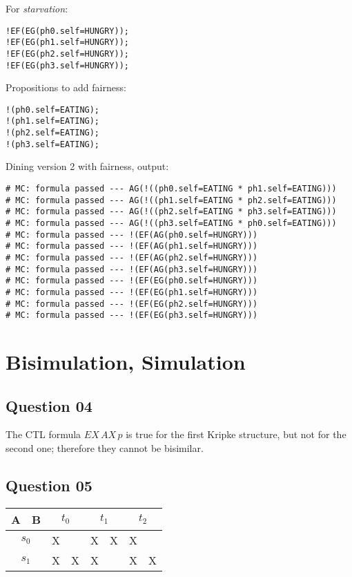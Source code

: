 \documentclass[a4paper]{article}
\begin{document}
For \emph{starvation}:
\begin{lstlisting}
!EF(EG(ph0.self=HUNGRY));
!EF(EG(ph1.self=HUNGRY));
!EF(EG(ph2.self=HUNGRY));
!EF(EG(ph3.self=HUNGRY));
\end{lstlisting}

Propositions to add fairness:
\begin{lstlisting}
!(ph0.self=EATING);
!(ph1.self=EATING);
!(ph2.self=EATING);
!(ph3.self=EATING);
\end{lstlisting}

Dining version 2 with fairness, output:
\begin{lstlisting}
# MC: formula passed --- AG(!((ph0.self=EATING * ph1.self=EATING)))
# MC: formula passed --- AG(!((ph1.self=EATING * ph2.self=EATING)))
# MC: formula passed --- AG(!((ph2.self=EATING * ph3.self=EATING)))
# MC: formula passed --- AG(!((ph3.self=EATING * ph0.self=EATING)))
# MC: formula passed --- !(EF(AG(ph0.self=HUNGRY)))
# MC: formula passed --- !(EF(AG(ph1.self=HUNGRY)))
# MC: formula passed --- !(EF(AG(ph2.self=HUNGRY)))
# MC: formula passed --- !(EF(AG(ph3.self=HUNGRY)))
# MC: formula passed --- !(EF(EG(ph0.self=HUNGRY)))
# MC: formula passed --- !(EF(EG(ph1.self=HUNGRY)))
# MC: formula passed --- !(EF(EG(ph2.self=HUNGRY)))
# MC: formula passed --- !(EF(EG(ph3.self=HUNGRY)))
\end{lstlisting}

\section*{Bisimulation, Simulation}

\subsection*{Question 04}

The CTL formula $EX\,AX\,p$ is true for the first Kripke structure, but not
for the second one; therefore they cannot be bisimilar.

\subsection*{Question 05}

\begin{center}
\begin{tabular}{ | l | l || l | l | l | l | l | l | }
  \hline
      A & B &
      \multicolumn{2}{c|}{$t_0$} &
      \multicolumn{2}{c|}{$t_1$} &
      \multicolumn{2}{c|}{$t_2$} \\
  \hline
  \hline
      \multicolumn{2}{|c||}{$s_0$}
      & X & & X & X & X & \\
  \hline
      \multicolumn{2}{|c||}{$s_1$}
      & X & X & X & & X & X \\
  \hline
\end{tabular}
\end{center}
\end{document}
